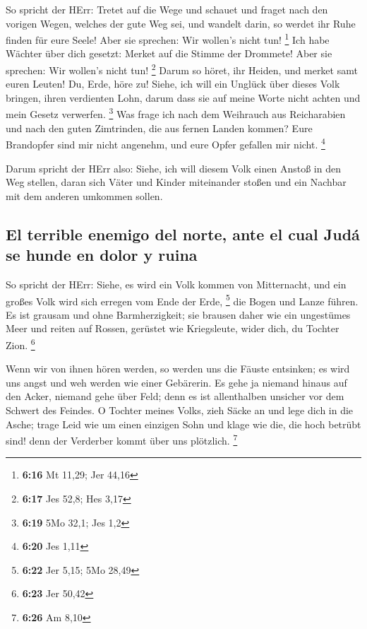  So spricht der HErr: Tretet auf die Wege und schauet und
fraget nach den vorigen Wegen, welches der gute Weg sei, und wandelt
darin, so werdet ihr Ruhe finden für eure Seele! Aber sie sprechen: Wir
wollen's nicht tun! \footnote{\textbf{6:16} Mt 11,29; Jer 44,16}
 Ich habe Wächter über dich gesetzt: Merket auf die
Stimme der Drommete! Aber sie sprechen: Wir wollen's nicht tun!
\footnote{\textbf{6:17} Jes 52,8; Hes 3,17}  Darum so
höret, ihr Heiden, und merket samt euren Leuten!  Du,
Erde, höre zu! Siehe, ich will ein Unglück über dieses Volk bringen,
ihren verdienten Lohn, darum dass sie auf meine Worte nicht achten und
mein Gesetz verwerfen. \footnote{\textbf{6:19} 5Mo 32,1; Jes 1,2}
 Was frage ich nach dem Weihrauch aus Reicharabien und
nach den guten Zimtrinden, die aus fernen Landen kommen? Eure Brandopfer
sind mir nicht angenehm, und eure Opfer gefallen mir nicht. \footnote{\textbf{6:20}
  Jes 1,11}

 Darum spricht der HErr also: Siehe, ich will diesem Volk
einen Anstoß in den Weg stellen, daran sich Väter und Kinder miteinander
stoßen und ein Nachbar mit dem anderen umkommen sollen.

\hypertarget{el-terrible-enemigo-del-norte-ante-el-cual-juduxe1-se-hunde-en-dolor-y-ruina}{%
\subsection{El terrible enemigo del norte, ante el cual Judá se hunde en
dolor y
ruina}\label{el-terrible-enemigo-del-norte-ante-el-cual-juduxe1-se-hunde-en-dolor-y-ruina}}

 So spricht der HErr: Siehe, es wird ein Volk kommen von
Mitternacht, und ein großes Volk wird sich erregen vom Ende der Erde,
\footnote{\textbf{6:22} Jer 5,15; 5Mo 28,49}  die Bogen
und Lanze führen. Es ist grausam und ohne Barmherzigkeit; sie brausen
daher wie ein ungestümes Meer und reiten auf Rossen, gerüstet wie
Kriegsleute, wider dich, du Tochter Zion. \footnote{\textbf{6:23} Jer
  50,42}

 Wenn wir von ihnen hören werden, so werden uns die
Fäuste entsinken; es wird uns angst und weh werden wie einer Gebärerin.
 Es gehe ja niemand hinaus auf den Acker, niemand gehe
über Feld; denn es ist allenthalben unsicher vor dem Schwert des
Feindes.  O Tochter meines Volks, zieh Säcke an und lege
dich in die Asche; trage Leid wie um einen einzigen Sohn und klage wie
die, die hoch betrübt sind! denn der Verderber kommt über uns plötzlich.
\footnote{\textbf{6:26} Am 8,10}

